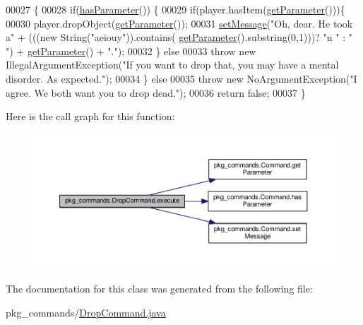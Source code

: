\begin{DoxyCode}
00027                                                                                               \{
00028         \textcolor{keywordflow}{if}(\hyperlink{classpkg__commands_1_1Command_a02af95ab3f1898a66259ab7c177b6998}{hasParameter}()) \{
00029             \textcolor{keywordflow}{if}(player.hasItem(\hyperlink{classpkg__commands_1_1Command_a41c92d445be73ea9d62320c65efb8434}{getParameter}()))\{
00030                 player.dropObject(\hyperlink{classpkg__commands_1_1Command_a41c92d445be73ea9d62320c65efb8434}{getParameter}());
00031                 \hyperlink{classpkg__commands_1_1Command_ae210ff216fe908b111ba1c988a963d13}{setMessage}(\textcolor{stringliteral}{"Oh, dear. He took a"} + (((\textcolor{keyword}{new} String(\textcolor{stringliteral}{"aeiouy"})).contains(
      \hyperlink{classpkg__commands_1_1Command_a41c92d445be73ea9d62320c65efb8434}{getParameter}().substring(0,1)))? \textcolor{stringliteral}{"n "} : \textcolor{stringliteral}{" "}) + \hyperlink{classpkg__commands_1_1Command_a41c92d445be73ea9d62320c65efb8434}{getParameter}() + \textcolor{stringliteral}{"."});
00032             \} \textcolor{keywordflow}{else}
00033                 \textcolor{keywordflow}{throw} \textcolor{keyword}{new} IllegalArgumentException(\textcolor{stringliteral}{"If you want to drop that, you may have a mental
       disorder. As expected."});
00034         \} \textcolor{keywordflow}{else}
00035             \textcolor{keywordflow}{throw} \textcolor{keyword}{new} NoArgumentException(\textcolor{stringliteral}{"I agree. We both want you to drop dead."});
00036         \textcolor{keywordflow}{return} \textcolor{keyword}{false};
00037     \}
\end{DoxyCode}


Here is the call graph for this function\-:\nopagebreak
\begin{figure}[H]
\begin{center}
\leavevmode
\includegraphics[width=350pt]{classpkg__commands_1_1DropCommand_a742e37b2d2dd4e111130811ee2f4dd0b_cgraph}
\end{center}
\end{figure}




The documentation for this class was generated from the following file\-:\begin{DoxyCompactItemize}
\item 
pkg\-\_\-commands/\hyperlink{DropCommand_8java}{Drop\-Command.\-java}\end{DoxyCompactItemize}
